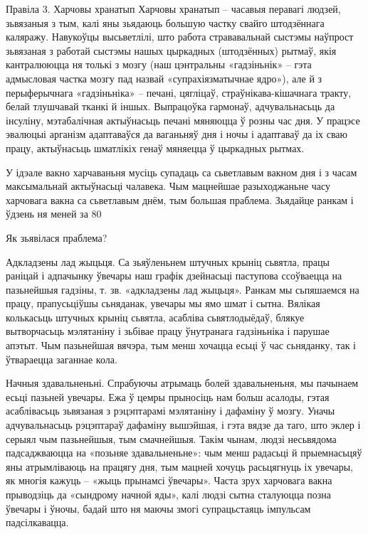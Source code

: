 Правіла 3. Харчовы хранатып
Харчовы хранатып – часавыя перавагі людзей, зьвязаныя з тым, калі яны зьядаюць большую частку свайго штодзённага каляражу. Навукоўцы высьветлілі, што работа стрававальнай сыстэмы наўпрост зьвязаная з работай сыстэмы нашых цыркадных (штодзённых) рытмаў, якія кантралююцца ня толькі з мозгу (наш цэнтральны «гадзіньнік» – гэта адмысловая частка мозгу пад назвай «супрахіязматычнае ядро»), але й з перыферычнага «гадзіньніка» – печані, цягліцаў, страўнікава-кішачнага тракту, белай тлушчавай тканкі й іншых. Выпрацоўка гармонаў, адчувальнасьць да інсуліну, мэтабалічная актыўнасьць печані мяняюцца ў розны час дня. У працэсе эвалюцыі арганізм адаптаваўся да ваганьняў дня і ночы і адаптаваў да іх сваю працу, актыўнасьць шматлікіх генаў мяняецца ў цыркадных рытмах.

У ідэале вакно харчаваньня мусіць супадаць са сьветлавым вакном дня і з часам максымальнай актыўнасьці чалавека. Чым мацнейшае разыходжаньне часу харчовага вакна са сьветлавым днём, тым большая праблема. Зьядайце ранкам і ўдзень ня меней за 80%

Як зьявілася праблема?

Адкладзены лад жыцьця.
Са зьяўленьнем штучных крыніц сьвятла, працы раніцай і адпачынку ўвечары наш графік дзейнасьці паступова ссоўваецца на пазьнейшыя гадзіны, т. зв. «адкладзены лад жыцьця». Ранкам мы сьпяшаемся на працу, прапусьціўшы сьняданак, увечары мы ямо шмат і сытна. Вялікая колькасьць штучных крыніц сьвятла, асабліва сьвятлодыёдаў, блякуе вытворчасьць мэлятаніну і зьбівае працу ўнутранага гадзіньніка і парушае апэтыт. Чым пазьнейшая вячэра, тым менш хочацца есьці ў час сьняданку, так і ўтвараецца заганнае кола.

Начныя здавальненьні.
Спрабуючы атрымаць болей здавальненьня, мы пачынаем есьці пазьней увечары. Ежа ў цемры прыносіць нам больш асалоды, гэтая асаблівасьць зьвязаная з рэцэптарамі мэлятаніну і дафаміну ў мозгу. Уначы адчувальнасьць рэцэптараў дафаміну вышэйшая, і гэта вядзе да таго, што эклер і серыял чым пазьнейшыя, тым смачнейшыя. Такім чынам, людзі несьвядома падсаджваюцца на «позьняе здавальненьне»: чым менш радасьці й прыемнасьцяў яны атрымліваюць на працягу дня, тым мацней хочуць расьцягнуць іх увечары, як многія кажуць – «жыць прынамсі ўвечары». Часта зрух харчовага вакна прыводзіць да «сындрому начной яды», калі людзі сытна сталуюцца позна ўвечары і ўночы, бадай што ня маючы змогі супрацьстаяць імпульсам падсілкавацца.

